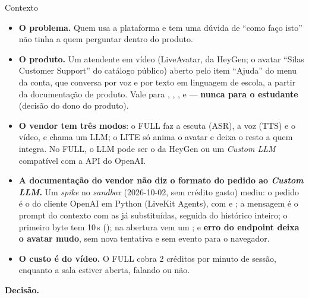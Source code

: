 \begin{especificacao}{Contexto}
\begin{itemize}
  \item \textbf{O problema.} Quem usa a plataforma e tem uma dúvida de
    \enquote{como faço isto} não tinha a quem perguntar dentro do produto.
  \item \textbf{O produto.} Um atendente em vídeo (LiveAvatar, da HeyGen; o
    avatar \enquote{Silas Customer Support} do catálogo público) aberto pelo item
    \enquote{Ajuda} do menu da conta, que conversa por voz e por texto em
    linguagem de escola, a partir da documentação de produto. Vale para
    , , ,
     e  --- \textbf{nunca para o estudante}
    (decisão do dono do produto).
  \item \textbf{O vendor tem três modos}: o FULL faz a escuta (ASR), a voz (TTS)
    e o vídeo, e chama um LLM; o LITE só anima o avatar e deixa o resto a quem
    integra. No FULL, o LLM pode ser o da HeyGen ou um \emph{Custom LLM}
    compatível com a API do OpenAI.
  \item \textbf{A documentação do vendor não diz o formato do pedido ao
    \emph{Custom LLM}.} Um \emph{spike} no \emph{sandbox} (2026-10-02, sem
    crédito gasto) mediu: o pedido é o do cliente OpenAI em Python (LiveKit
    Agents), com  e ; a mensagem
     é o prompt do contexto com as  já
    substituídas, seguida do histórico inteiro; o primeiro byte tem
    10\,s (); na abertura vem um
    ; e \textbf{erro do endpoint deixa o avatar
    mudo}, sem nova tentativa e sem evento para o navegador.
  \item \textbf{O custo é do vídeo.} O FULL cobra 2 créditos por minuto de
    sessão, enquanto a sala estiver aberta, falando ou não.
\end{itemize}
\end{especificacao}

\textbf{Decisão.}

